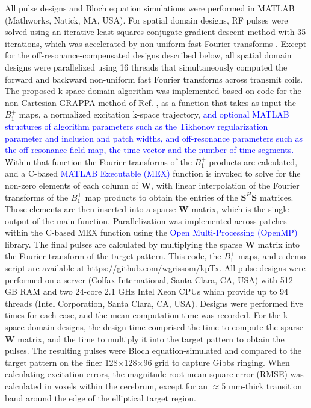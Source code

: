 \par All pulse designs and Bloch equation simulations were performed in MATLAB (Mathworks, Natick, MA, USA).
For spatial domain designs, 
RF pulses were solved using an iterative least-squares conjugate-gradient descent method with 35 iterations,
which was accelerated by non-uniform fast Fourier transforms \cite{Fessler:2003fk}. 
Except for the off-resonance-compensated designs described below, 
all spatial domain designs were parallelized using 16 threads that simultaneously computed the forward and backward 
non-uniform fast Fourier transforms across transmit coils. 
The proposed k-space domain algorithm was implemented based on code for the non-Cartesian GRAPPA method of Ref. \cite{luo2019grappa},
as a function that takes as input the $B_1^+$ maps, 
a normalized excitation k-space trajectory, \textcolor{blue}{and optional MATLAB structures of algorithm parameters such as the Tikhonov regularization parameter
and inclusion and patch widths, and off-resonance parameters such as the off-resonance field map, the time vector and the number of time segments.} 
Within that function the Fourier transforms of the $B_1^+$ products are calculated,
and a C-based \textcolor{blue}{MATLAB Executable (MEX)} function is invoked to solve for the non-zero elements of each column of $\bm{W}$,
with linear interpolation of the Fourier transforms of the $B_1^+$ map products to obtain the entries of the $\bm{S}^H\bm{S}$ matrices. 
Those elements are then inserted into a sparse $\bm{W}$ matrix, which is the single output of the main function. 
Parallelization was implemented across patches within the C-based MEX function using the \textcolor{blue}{Open Multi-Processing (OpenMP)} library. 
The final pulses are calculated by multiplying the sparse $\bm{W}$ matrix into the Fourier transform of the target pattern. 
This code, the $B_1^+$ maps, and a demo script are available at https://github.com/wgrissom/kpTx. 
All pulse designs were performed on a server (Colfax International, Santa Clara, CA, USA) 
with 512 GB RAM and two 24-core 2.1 GHz Intel Xeon CPUs which provide up to 94 threads (Intel Corporation, Santa Clara, CA, USA). 
Designs were performed five times for each case, and the mean computation time was recorded.
For the k-space domain designs, the design time comprised the time to compute the sparse $\bm{W}$ matrix, 
and the time to multiply it into the target pattern to obtain the pulses.
The resulting pulses were Bloch equation-simulated and compared to the target pattern on the finer 128$\times$128$\times$96 grid to capture Gibbs ringing. 
When calculating excitation errors, the magnitude root-mean-square error (RMSE) was calculated in voxels within the cerebrum,
except for an $\approx$5 mm-thick transition band around the edge of the elliptical target region.

